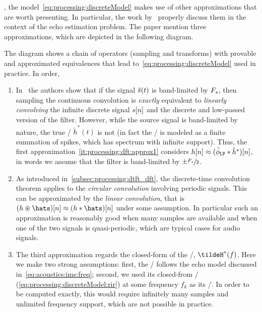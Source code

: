 , the model~\eqref{eq:processing:discreteModel} makes use of other approximations that are worth presenting.
In particular, the work by~ properly discuss them in the context of the echo estimation problem.
The paper mention three approximations, which are depicted in the following diagram.
\begin{figure}[!h]
    \begin{fullwidth}
    \centering
    
    \end{fullwidth}
\end{figure}
The diagram shows a chain of operators (sampling and transforms) with provable and approximated equivalences that lead to~\cref{eq:processing:discreteModel} used in practice.
In order,
\begin{enumerate}[label=(\roman*)]
    \item\label{it:processing:dft:approx1}
    In~ the authors show that if the signal $\tilde{s}(t)$ is band-limited by $F_s$,
    then sampling the continuous convolution is \textit{exactly} equivalent to \textit{linearly convolving} the infinite discrete signal ${s}[n]$ and the discrete and low-passed version of the filter.
    However, while the source signal is band-limited by nature, the true \RIR/ $\tilde{h}^*(t)$ is not (in fact the \RIR/ is modeled as a finite summation of spikes, which has spectrum with infinite support).
    Thus, the first approximation~\ref{it:processing:dft:approx1} considers ${h}[n] \approx (\lowpassfilter \convDis \tilde{h}^*)[n]$, in words we assume that the filter is band-limited by $\pm \sfrac{F_s}{2}$.

    \item\label{it:processing:dft:approx2}
    As introduced in~\cref{subsec:processing:dtft_dft}, the discrete-time convolution theorem applies to the \textit{circular convolution} involving periodic signals.
    This can be approximated by the \textit{linear convolution}, that is $(h \circledast \hats)[n] \approx (h \convDis \hats)[n]$ under some assumption.
    In particular such an approximation is reasonably good when many samples are available and when one of the two signals is quasi-periodic, which are typical cases for audio signals.

    \item\label{it:processing:dft:approx3}
    The third approximation regards the closed-form of the \RTF/, $\tildeH^*(f)$.
    Here we make two strong assumptions:
    first, the \RTF/ follows the echo model discussed in~\cref{eq:acoustics:ims:freq};
    second, we used its closed-from \DTFT/ (\cref{eq:processing:discreteModel:rir}) at some frequency $f_k$ as its \DFT/.
    In order to be computed exactly, this would require infinitely many samples and unlimited frequency support, which are not possible in practice.
\end{enumerate}
